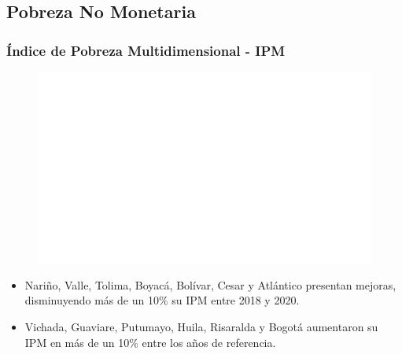     \subsection{Pobreza No Monetaria}

        \subsubsection{Índice de Pobreza Multidimensional - IPM}

    \begin{figure}[H]
        \caption[Índice de Pobreza Multidimensional por departamentos- Cambio porcentual entre 2018 y 2020 ]{\label{ipm_dptos_cambio} }
        \begin{center}
        \includegraphics[width=\textwidth,keepaspectratio]{img/var_268_map_change.png}
        \end{center}
    \end{figure}
            \begin{itemize}
                    \item Nariño, Valle, Tolima, Boyacá, Bolívar, Cesar y Atlántico presentan mejoras, disminuyendo más de un 10\% su IPM entre 2018 y 2020.
                    \item Vichada, Guaviare, Putumayo, Huila, Risaralda y Bogotá aumentaron su IPM en más de un 10\% entre los años de referencia.
                    \end{itemize}

